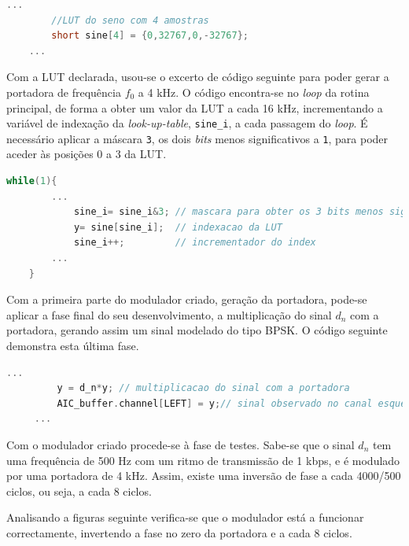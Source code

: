 \documentclass[11pt]{article}
\numberwithin{equation}{section}
\begin{document}
\begin{lstlisting}[language=C]
	...
		//LUT do seno com 4 amostras
		short sine[4] = {0,32767,0,-32767};
	...
\end{lstlisting}

Com a LUT declarada, usou-se o excerto de código seguinte para poder gerar a portadora de frequência $f_0$ a 4 kHz. O código encontra-se no \textit{loop} da rotina principal, de forma a obter um valor da LUT a cada 16 kHz, incrementando a variável de indexação da \textit{look-up-table}, \texttt{sine\_i}, a cada passagem do \textit{loop}. É necessário aplicar a máscara \texttt{3}, os dois \textit{bits} menos significativos a \texttt{1}, para poder aceder às posições 0 a 3 da LUT.

\begin{lstlisting}[language=C]
	while(1){	
		...
			sine_i= sine_i&3; // mascara para obter os 3 bits menos significativos
			y= sine[sine_i];  // indexacao da LUT
			sine_i++;		  // incrementador do index
		...
	}
\end{lstlisting}

Com a primeira parte do modulador criado, geração da portadora, pode-se aplicar a fase final do seu desenvolvimento, a multiplicação do sinal $d_n$ com a portadora, gerando assim um sinal modelado do tipo BPSK. O código seguinte demonstra esta última fase.  

\begin{lstlisting}[language=C]
	 ...
		 y = d_n*y; // multiplicacao do sinal com a portadora
		 AIC_buffer.channel[LEFT] = y;// sinal observado no canal esquerdo
	 ...
\end{lstlisting}

Com o modulador criado procede-se à fase de testes. Sabe-se que o sinal $d_n$ tem uma frequência de 500 Hz com um ritmo de transmissão de 1 kbps, e é modulado por uma portadora de 4 kHz. Assim, existe uma inversão de fase a cada 4000/500 ciclos, ou seja, a cada 8 ciclos.

Analisando a figuras seguinte verifica-se que o modulador está a funcionar correctamente, invertendo a fase no zero da portadora e a cada 8 ciclos.
\end{document}
